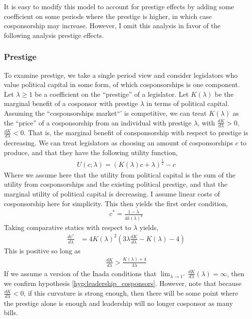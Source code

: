 \documentclass{article}
\begin{document}
It is easy to modify this model to account for prestige effects by adding some coefficient on some periods where the prestige is higher, in which case cosponsorship may increase. However, I omit this analysis in favor of the following analysis prestige effects. 

\subsubsection{Prestige}
\label{model:prestige}
To examine prestige, we take a single period view and consider legislators who value political capital in some form, of which cosponsorships is one component. Let $\lambda \geq 1$ be a coefficient on the ``prestige'' of a legislator. Let $K(\lambda)$ be the marginal benefit of a cosponsor with prestige $\lambda$ in terms of political capital. Assuming the ``cosponsorships market``' is competitive, we can treat $K(\lambda)$ as the ``price'' of a cosponsorship from an individual with prestige $\lambda$, with $\frac{dK}{d\lambda} > 0$, $\frac{dK}{d\lambda} < 0$. That is, the marginal benefit of consponsorship with respect to prestige is decreasing. We can treat legislators as choosing an amount of cosponsorships $c$ to produce, and that they have the following utility function,
\begin{align*}
  U(c; \lambda) = (K(\lambda)c + \lambda)^{\frac{1}{2}} - c
\end{align*}
Where we assume here that the utility from political capital is the sum of the utility from cosponsorships and the existing political prestige, and that the marginal utility of political capital is decreasing. I assume linear costs of cosponsorship here for simplicity. This then yields the first order condition,
\begin{align*}
  c^* = \frac{1 - \lambda}{4 k(\lambda)^3}
\end{align*}
Taking comparative statics with respect to $\lambda$ yields, 
\begin{align*}
  \frac{dc^*}{d\lambda} &= 4K(\lambda)^2\left(3 \lambda \frac{dK}{d\lambda} - K(\lambda) - 4\right)
\end{align*}
This is positive so long as
\begin{align*}
  \frac{dK}{d\lambda} > \frac{K(\lambda) + 4}{3 \lambda}
\end{align*}
If we assume a version of the Inada conditions that $\lim_{\lambda \to 1^+} \frac{dK}{d\lambda}(\lambda) = \infty$, then we confirm hypothesis \ref{hyp:leadership_cosponsors}. However, note that because $\frac{dK}{d\lambda} < 0$, if this curvature is strong enough, then there will be some point where the prestige alone is enough and leadership will no longer cosponsor as many bills. 
\end{document}
